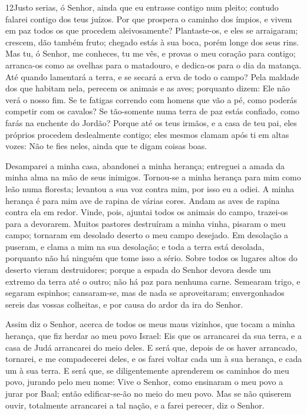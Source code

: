 \lettrine{12} Justo serias, ó Senhor, ainda que eu entrasse
contigo num pleito; contudo falarei contigo dos teus juízos. Por que
prospera o caminho dos ímpios, e vivem em paz todos os que procedem
aleivosamente? Plantaste-os, e eles se arraigaram; crescem, dão
também fruto; chegado estás à sua boca, porém longe dos seus rins.
Mas tu, ó Senhor, me conheces, tu me vês, e provas o meu coração
para contigo; arranca-os como as ovelhas para o matadouro, e
dedica-os para o dia da matança. Até quando lamentará a terra, e
se secará a erva de todo o campo? Pela maldade dos que habitam nela,
perecem os animais e as aves; porquanto dizem: Ele não verá o nosso
fim. Se te fatigas correndo com homens que vão a pé, como
poderás competir com os cavalos? Se tão-somente numa terra de paz
estás confiado, como farás na enchente do Jordão? Porque até os
teus irmãos, e a casa de teu pai, eles próprios procedem
deslealmente contigo; eles mesmos clamam após ti em altas vozes: Não
te fies neles, ainda que te digam coisas boas.

Desamparei a minha casa, abandonei a minha herança; entreguei a
amada da minha alma na mão de seus inimigos. Tornou-se a minha
herança para mim como leão numa floresta; levantou a sua voz contra
mim, por isso eu a odiei. A minha herança é para mim ave de
rapina de várias cores. Andam as aves de rapina contra ela em redor.
Vinde, pois, ajuntai todos os animais do campo, trazei-os para a
devorarem. Muitos pastores destruíram a minha vinha, pisaram
o meu campo; tornaram em desolado deserto o meu campo desejado.
Em desolação a puseram, e clama a mim na sua desolação; e
toda a terra está desolada, porquanto não há ninguém que tome isso a
sério. Sobre todos os lugares altos do deserto vieram
destruidores; porque a espada do Senhor devora desde um extremo da
terra até o outro; não há paz para nenhuma carne. Semearam
trigo, e segaram espinhos; cansaram-se, mas de nada se aproveitaram;
envergonhados sereis das vossas colheitas, e por causa do ardor da
ira do Senhor.

Assim diz o Senhor, acerca de todos os meus maus vizinhos, que
tocam a minha herança, que fiz herdar ao meu povo Israel: Eis que os
arrancarei da sua terra, e a casa de Judá arrancarei do meio deles.
E será que, depois de os haver arrancado, tornarei, e me
compadecerei deles, e os farei voltar cada um à sua herança, e cada
um à sua terra. E será que, se diligentemente aprenderem os
caminhos do meu povo, jurando pelo meu nome: Vive o Senhor, como
ensinaram o meu povo a jurar por Baal; então edificar-se-ão no meio
do meu povo. Mas se não quiserem ouvir, totalmente arrancarei
a tal nação, e a farei perecer, diz o Senhor.

